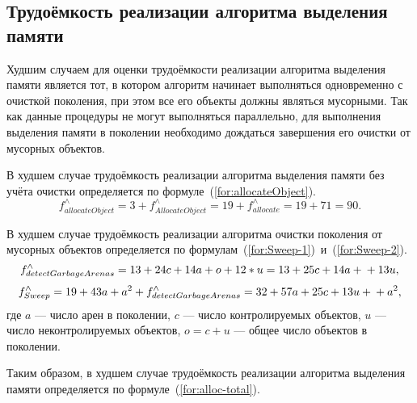 \subsection{Трудоёмкость реализации алгоритма выделения памяти}

Худшим случаем для оценки трудоёмкости реализации алгоритма выделения памяти является тот, в котором алгоритм начинает выполняться одновременно с очисткой поколения, при этом все его объекты должны являться мусорными. Так как данные процедуры не могут выполняться параллельно, для выполнения выделения памяти в поколении необходимо дождаться завершения его очистки от мусорных объектов.

В худшем случае трудоёмкость реализации алгоритма выделения памяти без учёта очистки определяется по формуле~(\ref{for:allocateObject}).
\begin{equation}
	\label{for:allocateObject}
	f_{allocateObject}^{\wedge} = 3 + f_{AllocateObject}^{\wedge} = 19 + f_{allocate}^{\wedge} = 19 + 71 = 90.
\end{equation}

В худшем случае трудоёмкость реализации алгоритма очистки поколения от мусорных объектов определяется по формулам~(\ref{for:Sweep-1})~и~(\ref{for:Sweep-2}).
\begin{equation}
	\label{for:Sweep-1}
		f_{detectGarbageArenas}^{\wedge} = 13 + 24c + 14a + o + 12*u = 13 + 25c + 14a +\\+ 13u,
\end{equation}
\begin{equation}
	\label{for:Sweep-2}
		f_{Sweep}^{\wedge} = 19 + 43a + a^2 + f_{detectGarbageArenas}^{\wedge} = 32 + 57a + 25c + 13u +\\+ a^2,
\end{equation}
где $a$ --- число арен в поколении, $c$ --- число контролируемых объектов, $u$ --- число неконтролируемых объектов, $o = c + u$ --- общее число объектов в поколении.

Таким образом, в худшем случае трудоёмкость реализации алгоритма выделения памяти определяется по формуле~(\ref{for:alloc-total}).

